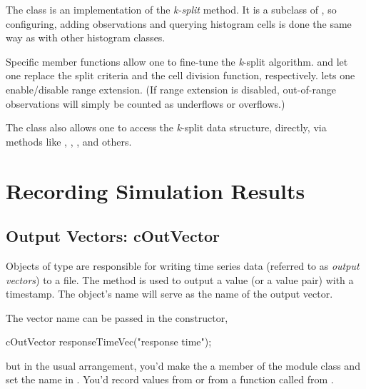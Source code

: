 The  class is an implementation of the \textit{k-split}
method. It is a subclass of , so configuring,
adding observations and querying histogram cells is done the same way as
with other histogram classes.

Specific member functions allow one to fine-tune the \textit{k}-split
algorithm.  and  let one replace
the split criteria and the cell division function, respectively.
 lets one enable/disable range extension. (If
range extension is disabled, out-of-range observations will simply be
counted as underflows or overflows.)

The class also allows one to access the \textit{k}-split data structure,
directly, via methods like , ,
, and others.



\section{Recording Simulation Results}
\label{sec:sim-lib:result-recording}

\subsection{Output Vectors: cOutVector}
\label{sec:sim-lib:coutvector}

Objects of type  are responsible for writing time series
data (referred to as \textit{output vectors}) to a file. The 
method is used to output a value (or a value pair) with a timestamp.
The object's name will serve as the name of the output vector.

The vector name can be passed in the constructor,

\begin{cpp}
cOutVector responseTimeVec("response time");
\end{cpp}

but in the usual arrangement, you'd make the  a member
of the module class and set the name in . You'd
record values from  or from a function called from
.


